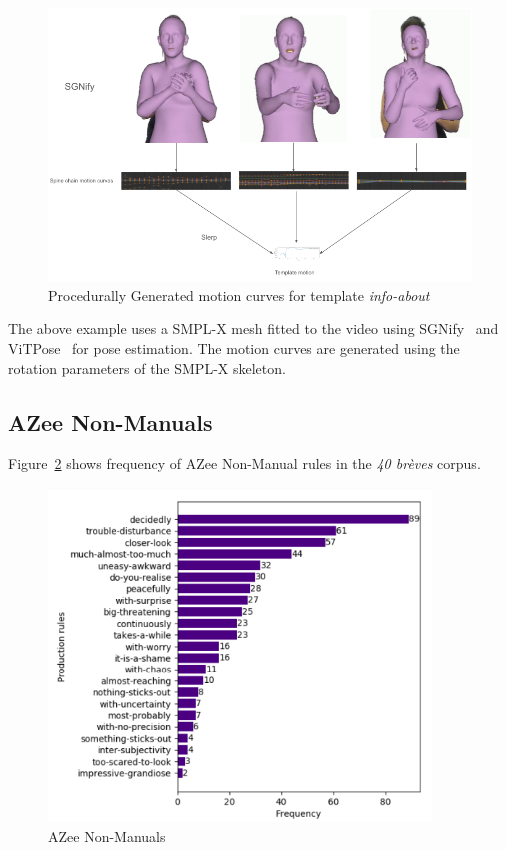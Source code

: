 \documentclass[../main.tex]{subfiles}
\begin{document}
\begin{figure}
    \centering \includegraphics[width = 5in]{chapters/intermediate_blocks_pose_correction/images/motion_curves_template_procedural_pose_est.png}
    \caption{Procedurally Generated motion curves for template \emph{info-about}}
    \label{fig:motion_curves_template_procedural_pose_est}
\end{figure}

The above example uses a SMPL-X mesh fitted to the video using SGNify~\cite{Forte_2023_CVPR} and ViTPose~\cite{xu2022vitpose} for pose estimation. The motion curves are generated using the rotation parameters of the SMPL-X skeleton.

\subsection{AZee Non-Manuals}
\label{annex:facial_expressions:azee_non_manuals}

Figure~\ref{fig:azee_non_manuals} shows frequency of AZee Non-Manual rules in the \emph{40 brèves} corpus.

\begin{figure}[h]
    \centering
    \includegraphics[width=4in]{chapters/facial_expressions/images/azee_non_manuals.png}
    \caption{AZee Non-Manuals}
    \label{fig:azee_non_manuals}
\end{figure}
\end{document}
